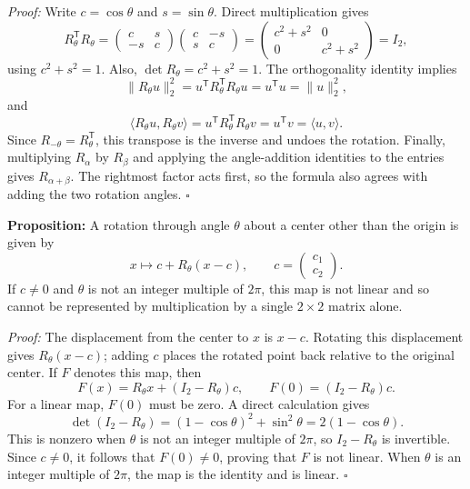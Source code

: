\documentclass[a4paper,11pt,abstract=true]{scrartcl}
\newcommand{\s}{\square}
\theoremstyle{dotlessP}
\theoremstyle{dotlessS}
\theoremstyle{remark}
\theoremstyle{definition}
\begin{document}
\begin{claim_box}
\textit{Proof:} Write $c=\cos\theta$ and $s=\sin\theta$. Direct
multiplication gives
\[
R_{\theta}^{\mathsf{T}}R_{\theta}
=\begin{pmatrix}c&s\\-s&c\end{pmatrix}
  \begin{pmatrix}c&-s\\s&c\end{pmatrix}
=\begin{pmatrix}c^2+s^2&0\\0&c^2+s^2\end{pmatrix}
=I_2,
\]
using $c^2+s^2=1$. Also,
$\det R_{\theta}=c^2+s^2=1$. The orthogonality identity implies
\[
\|R_{\theta}u\|_2^2
=u^{\mathsf{T}}R_{\theta}^{\mathsf{T}}R_{\theta}u
=u^{\mathsf{T}}u=\|u\|_2^2,
\]
and
\[
\langle R_{\theta}u,R_{\theta}v\rangle
=u^{\mathsf{T}}R_{\theta}^{\mathsf{T}}R_{\theta}v
=u^{\mathsf{T}}v=\langle u,v\rangle.
\]
Since $R_{-\theta}=R_{\theta}^{\mathsf{T}}$, this transpose is the
inverse and undoes the rotation. Finally, multiplying $R_{\alpha}$ by
$R_{\beta}$ and applying the angle-addition identities to the entries
gives $R_{\alpha+\beta}$. The rightmost factor acts first, so the
formula also agrees with adding the two rotation angles.
\hfill$\square$
\end{claim_box}

\begin{problem_box}
\textbf{Proposition:}
A rotation through angle $\theta$ about a center other than the origin
is given by
\[
x\longmapsto c+R_{\theta}(x-c),
\qquad c=\begin{pmatrix}c_1\\c_2\end{pmatrix}.
\]
If $c\neq0$ and $\theta$ is not an integer multiple of $2\pi$, this
map is not linear and so cannot be represented by multiplication by a
single $2\times2$ matrix alone.
\end{problem_box}

\begin{claim_box}
\textit{Proof:} The displacement from the center to $x$ is $x-c$.
Rotating this displacement gives $R_{\theta}(x-c)$; adding $c$ places
the rotated point back relative to the original center. If $F$ denotes
this map, then
\[
F(x)=R_{\theta}x+(I_2-R_{\theta})c,
\qquad F(0)=(I_2-R_{\theta})c.
\]
For a linear map, $F(0)$ must be zero. A direct calculation gives
\[
\det(I_2-R_{\theta})
=(1-\cos\theta)^2+\sin^2\theta
=2(1-\cos\theta).
\]
This is nonzero when $\theta$ is not an integer multiple of $2\pi$,
so $I_2-R_{\theta}$ is invertible. Since $c\neq0$, it follows that
$F(0)\neq0$, proving that $F$ is not linear. When $\theta$ is an
integer multiple of $2\pi$, the map is the identity and is linear.
\hfill$\square$
\end{claim_box}
\end{document}
